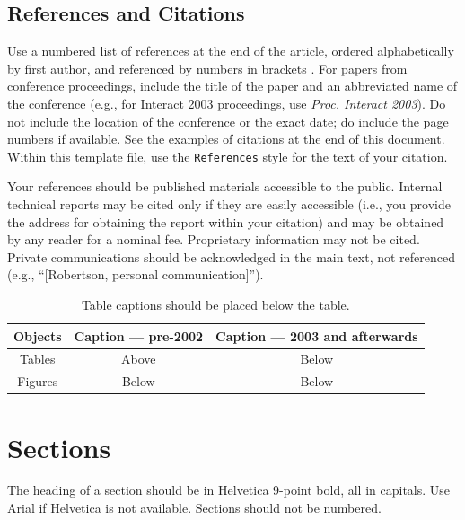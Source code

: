 \documentclass{sigchi}
\newcommand\tabhead[1]{\small\textbf{#1}}
\begin{document}
\subsection{References and Citations}

Use a numbered list of references at the end of the article, ordered
alphabetically by first author, and referenced by numbers in brackets
\cite{ethics,
  Klemmer:2002:WSC:503376.503378,
  Mather:2000:MUT,
  Zellweger:2001:FAO:504216.504224}. For
papers from conference proceedings, include the title of the paper and
an abbreviated name of the conference (e.g., for Interact 2003
proceedings, use \textit{Proc. Interact 2003}). Do not include the
location of the conference or the exact date; do include the page
numbers if available. See the examples of citations at the end of this
document. Within this template file, use the \texttt{References} style
for the text of your citation.

Your references should be published materials accessible to the
public.  Internal technical reports may be cited only if they are
easily accessible (i.e., you provide the address for obtaining the
report within your citation) and may be obtained by any reader for a
nominal fee.  Proprietary information may not be cited. Private
communications should be acknowledged in the main text, not referenced
(e.g., ``[Robertson, personal communication]'').

\begin{table}
  \centering
  \begin{tabular}{|c|c|c|}
    \hline
    \tabhead{Objects} &
    \multicolumn{1}{|p{0.3\columnwidth}|}{\centering\tabhead{Caption --- pre-2002}} &
    \multicolumn{1}{|p{0.4\columnwidth}|}{\centering\tabhead{Caption --- 2003 and afterwards}} \\
    \hline
    Tables & Above & Below \\
    \hline
    Figures & Below & Below \\
    \hline
  \end{tabular}
  \caption{Table captions should be placed below the table.}
  \label{tab:table1}
\end{table}

\section{Sections}

The heading of a section should be in Helvetica 9-point bold, all in
capitals. Use Arial if Helvetica is not available. Sections should
not be numbered.
\end{document}
